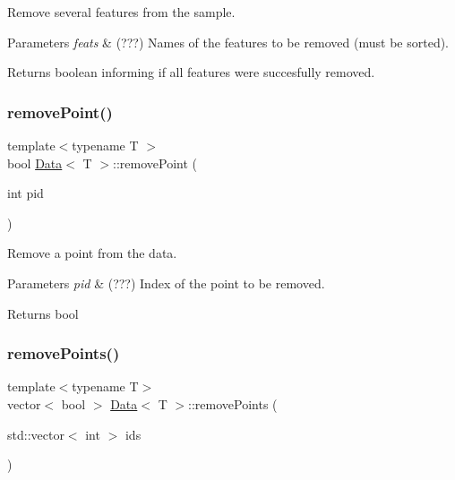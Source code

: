 Remove several features from the sample. 


\begin{DoxyParams}{Parameters}
{\em feats} & (???) Names of the features to be removed (must be sorted). \\
\hline
\end{DoxyParams}
\begin{DoxyReturn}{Returns}
boolean informing if all features were succesfully removed. 
\end{DoxyReturn}
\mbox{\label{class_data_a92ad77892fa46016d890d4ef4954ef2f}} 
\subsubsection{\texorpdfstring{remove\+Point()}{removePoint()}}
{\footnotesize\ttfamily template$<$typename T $>$ \\
bool \hyperlink{class_data}{Data}$<$ T $>$\+::remove\+Point (\begin{DoxyParamCaption}\item[{int}]{pid }\end{DoxyParamCaption})}



Remove a point from the data. 


\begin{DoxyParams}{Parameters}
{\em pid} & (???) Index of the point to be removed. \\
\hline
\end{DoxyParams}
\begin{DoxyReturn}{Returns}
bool 
\end{DoxyReturn}
\mbox{\label{class_data_ae5a3ca86bedc35bef909aac993439827}} 
\subsubsection{\texorpdfstring{remove\+Points()}{removePoints()}}
{\footnotesize\ttfamily template$<$typename T$>$ \\
vector$<$ bool $>$ \hyperlink{class_data}{Data}$<$ T $>$\+::remove\+Points (\begin{DoxyParamCaption}\item[{std\+::vector$<$ int $>$}]{ids }\end{DoxyParamCaption})}



